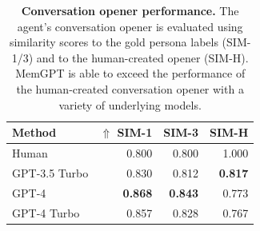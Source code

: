 






\begin{table}[t]
\caption{
\textbf{Conversation opener performance.}
The agent's conversation opener is evaluated using similarity scores to the gold persona labels (SIM-1/3) and to the human-created opener (SIM-H). 
MemGPT is able to exceed the performance of the human-created conversation opener with a variety of underlying models.
}
\label{table:msc-opener-task}
\begin{center}
\begin{tabular}{lrrr}
\toprule
\bf Method 
&  $\Uparrow$ \textbf{SIM-1} & \textbf{SIM-3} & \textbf{SIM-H}
\\
\midrule
Human & 0.800 & 0.800 & 1.000  \\
\midrule
GPT-3.5 Turbo & 0.830 & 0.812 & \bf 0.817 \\
GPT-4 &  \bf 0.868 &  \bf 0.843 &  0.773 \\
GPT-4 Turbo & 0.857 & 0.828 & 0.767 \\
\bottomrule
\end{tabular}
\end{center}
\end{table}
